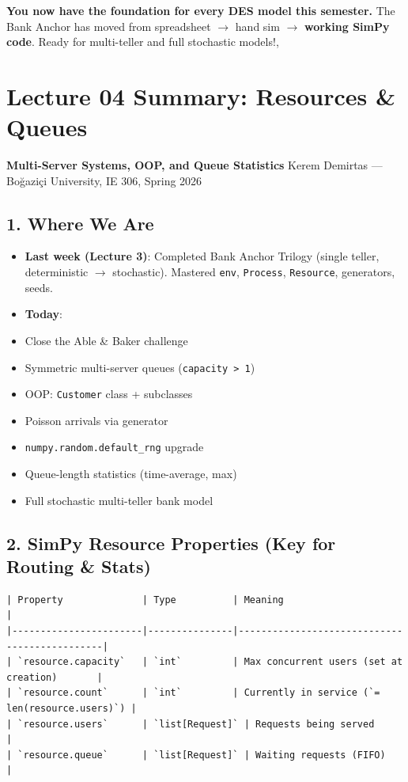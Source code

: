 \documentclass[11pt]{article}
\begin{document}
\textbf{You now have the foundation for every DES model this semester.}
The Bank Anchor has moved from spreadsheet $\rightarrow$ hand sim $\rightarrow$ \textbf{working SimPy code}. Ready for multi-teller and full stochastic models!,

\section*{Lecture 04 Summary: Resources \& Queues}
\textbf{Multi-Server Systems, OOP, and Queue Statistics}
Kerem Demirtas --- Boğaziçi University, IE 306, Spring 2026

\subsection*{1. Where We Are}
\begin{itemize}[leftmargin=*]
\item \textbf{Last week (Lecture 3)}: Completed Bank Anchor Trilogy (single teller, deterministic $\rightarrow$ stochastic). Mastered \texttt{env}, \texttt{Process}, \texttt{Resource}, generators, seeds.
\item \textbf{Today}: 
\item Close the Able \& Baker challenge
\item Symmetric multi-server queues (\texttt{capacity > 1})
\item OOP: \texttt{Customer} class + subclasses
\item Poisson arrivals via generator
\item \texttt{numpy.random.default\_rng} upgrade
\item Queue-length statistics (time-average, max)
\item Full stochastic multi-teller bank model
\end{itemize}

\subsection*{2. SimPy Resource Properties (Key for Routing \& Stats)}
\begin{verbatim}
| Property              | Type          | Meaning                                      |
|-----------------------|---------------|----------------------------------------------|
| `resource.capacity`   | `int`         | Max concurrent users (set at creation)       |
| `resource.count`      | `int`         | Currently in service (`= len(resource.users)`) |
| `resource.users`      | `list[Request]` | Requests being served                     |
| `resource.queue`      | `list[Request]` | Waiting requests (FIFO)                    |
\end{verbatim}
\end{document}
